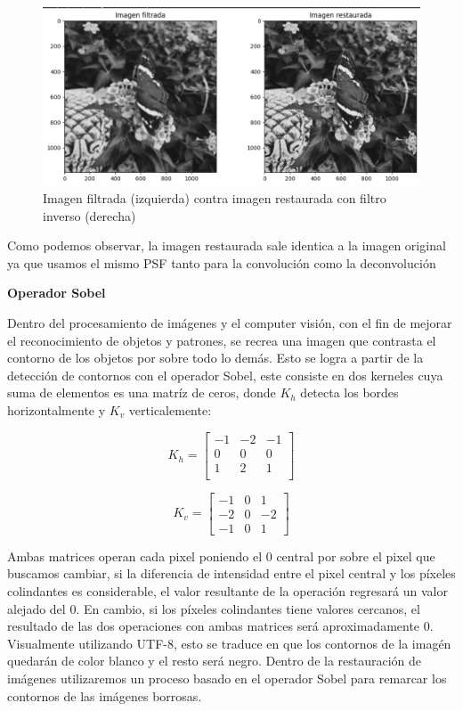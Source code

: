 \documentclass[eng]{ajceam-class}
\begin{document}
\begin{figure}[!h] 
 \centering
 \includegraphics[width=.8\columnwidth]{deconvolucion.png} 
 \caption{Imagen filtrada (izquierda) contra imagen restaurada con filtro inverso (derecha)} \label{fig-1}
\end{figure}
Como podemos observar, la imagen restaurada sale identica a la imagen original ya que usamos el mismo PSF tanto para la convolución como la deconvolución


\bigskip

\textbf{Operador Sobel}

Dentro del procesamiento de imágenes y el computer visión, con el fin de mejorar el reconocimiento de objetos y patrones, se recrea una imagen que contrasta el contorno de los objetos por sobre todo lo demás. Esto se logra a partir de la detección de contornos con el operador Sobel, este consiste en dos kerneles cuya suma de elementos es una matríz de ceros, donde $K_h$ detecta los bordes horizontalmente y $K_v$ verticalemente:

\bigskip 


\begin{equation}
    K_h = 
    \begin{bmatrix}
        -1 & -2 & -1 \\
        0 & 0 & 0 \\
        1 & 2 & 1\\
    \end{bmatrix} 
\end{equation}

\begin{equation}
        K_v = 
    \begin{bmatrix}
        -1 & 0 & 1 \\
        -2 & 0 & -2 \\
        -1 & 0 & 1
    \end{bmatrix}
\end{equation}

Ambas matrices operan cada pixel poniendo el $0$ central por sobre el pixel que buscamos cambiar, si la diferencia de intensidad entre el pixel central y los píxeles colindantes es considerable, el valor resultante de la operación regresará un valor alejado del 0. En cambio, si los píxeles colindantes tiene valores cercanos, el resultado de las dos operaciones con ambas matrices será aproximadamente $0$. Visualmente utilizando UTF-8, esto se traduce en que los contornos de la imagén quedarán de color blanco y el resto será negro.\cite{kim2013applications} Dentro de la restauración de imágenes utilizaremos un proceso basado en el operador Sobel para remarcar los contornos de las imágenes borrosas. 
\end{document}
